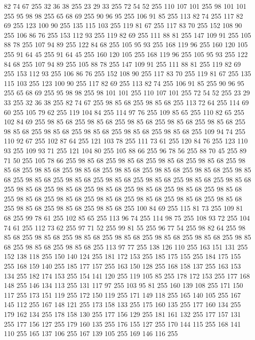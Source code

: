 82 74 67 255 32 36 38 255 23 29 33 255 72 54 52 255 110 107 101 255 98 101 101 255 95 98 98 255 65 68 69 255 90 96 95 255 106 91 85 255 113 82 74 255 117 82 69 255 123 100 90 255 135 115 103 255 119 81 67 255 117 83 70 255 152 108 90 255 106 86 76 255 153 112 93 255 119 82 69 255 111 88 81 255 147 109 91 255 105 88 78 255 107 94 89 255 122 84 68 255 105 95 93 255 168 119 96 255 160 120 105 255 91 64 45 255 91 64 45 255 160 120 105 255 168 119 96 255 105 95 93 255 122 84 68 255 107 94 89 255 105 88 78 255 147 109 91 255 111 88 81 255 119 82 69 255 153 112 93 255 106 86 76 255 152 108 90 255 117 83 70 255 119 81 67 255 135 115 103 255 123 100 90 255 117 82 69 255 113 82 74 255 106 91 85 255 90 96 95 255 65 68 69 255 95 98 98 255 98 101 101 255 110 107 101 255 72 54 52 255 23 29 33 255 32 36 38 255 82 74 67 255 98 85 68 255 98 85 68 255 113 72 64 255 114 69 60 255 105 79 62 255 119 104 84 255
114 97 76 255 109 85 65 255 110 82 65 255 102 84 69 255 98 85 68 255 98 85 68 255 98 85 68 255 98 85 68 255 98 85 68 255 98 85 68 255 98 85 68 255 98 85 68 255 98 85 68 255 98 85 68 255 109 94 74 255 110 92 67 255 102 87 64 255 121 103 78 255 111 73 61 255 120 84 76 255 123 110 93 255 109 93 71 255 121 104 80 255 105 88 66 255 96 78 56 255 88 70 45 255 89 71 50 255 105 78 66 255 98 85 68 255 98 85 68 255 98 85 68 255 98 85 68 255 98 85 68 255 98 85 68 255 98 85 68 255 98 85 68 255 98 85 68 255 98 85 68 255 98 85 68 255 98 85 68 255 98 85 68 255 98 85 68 255 98 85 68 255 98 85 68 255 98 85 68 255 98 85 68 255 98 85 68 255 98 85 68 255 98 85 68 255 98 85 68 255 98 85 68 255 98 85 68 255 98 85 68 255 98 85 68 255 98 85 68 255 98 85 68 255 98 85 68 255 98 85 68 255 98 85 68 255 98 85 68 255 100 84 69 255 115 81 73 255 109 81 68 255 99 78 61 255
102 85 65 255 113 96 74 255 114 98 75 255 108 93 72 255 104 74 61 255 112 73 62 255 97 71 52 255 99 81 55 255 96 77 54 255 98 82 64 255 98 85 68 255 98 85 68 255 98 85 68 255 98 85 68 255 98 85 68 255 98 85 68 255 98 85 68 255 98 85 68 255 98 85 68 255 113 97 77 255 138 126 110 255 163 151 131 255 152 138 118 255 150 140 124 255 181 172 153 255 185 175 155 255 184 175 155 255 168 159 140 255 185 177 157 255 163 150 128 255 168 158 137 255 163 153 134 255 182 174 153 255 154 141 120 255 119 105 85 255 178 172 153 255 177 168 148 255 146 134 113 255 131 117 97 255 103 95 81 255 160 139 108 255 171 150 117 255 173 151 119 255 172 150 119 255 171 149 118 255 165 140 105 255 167 145 112 255 167 148 121 255 173 158 133 255 175 160 135 255 177 160 134 255 179 162 134 255 178 158 130 255 177 156 129 255 181 161 132 255 177 157 131 255 177 156 127 255 179 160 135 255 176 155 127 255 170 144 115 255 168 141 110 255 165 137 106 255 167 139 105 255 169 146 116 255
